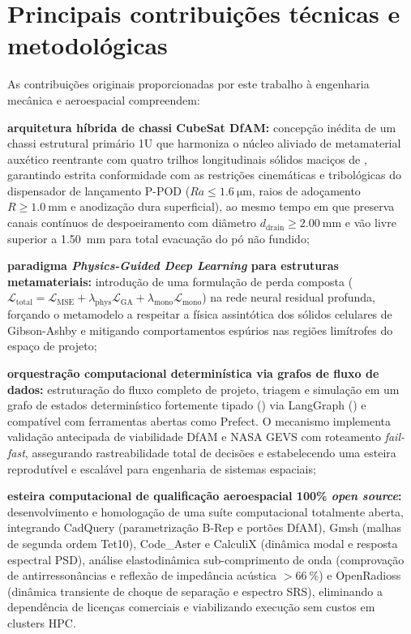 \section{Principais contribuições técnicas e metodológicas}
\label{sec:contribuicoes}

As contribuições originais proporcionadas por este trabalho à engenharia mecânica e aeroespacial compreendem:

\begin{alineas}
  \item \textbf{arquitetura híbrida de chassi CubeSat DfAM:} concepção inédita de um chassi estrutural primário 1U que harmoniza o núcleo aliviado de metamaterial auxético reentrante com quatro trilhos longitudinais sólidos maciços de \rail{}, garantindo estrita conformidade com as restrições cinemáticas e tribológicas do dispensador de lançamento P-POD ($Ra \le \SI{1.6}{\micro\metre}$, raios de adoçamento $R \ge \SI{1.0}{\milli\metre}$ e anodização dura superficial), ao mesmo tempo em que preserva canais contínuos de despoeiramento com diâmetro $d_{\text{drain}} \ge \SI{2.00}{\milli\metre}$ e vão livre superior a \SI{1.50}{\milli\metre} para total evacuação do pó não fundido;
  
  \item \textbf{paradigma \textit{Physics-Guided Deep Learning} para estruturas metamateriais:} introdução de uma formulação de perda composta ($\mathcal{L}_{\text{total}} = \mathcal{L}_{\text{MSE}} + \lambda_{\text{phys}}\mathcal{L}_{\text{GA}} + \lambda_{\text{mono}}\mathcal{L}_{\text{mono}}$) na rede neural residual profunda, forçando o metamodelo a respeitar a física assintótica dos sólidos celulares de Gibson-Ashby e mitigando comportamentos espúrios nas regiões limítrofes do espaço de projeto;
  
  \item \textbf{orquestração computacional determinística via grafos de fluxo de dados:} estruturação do fluxo completo de projeto, triagem e simulação em um grafo de estados determinístico fortemente tipado () via LangGraph () e compatível com ferramentas abertas como Prefect. O mecanismo implementa validação antecipada de viabilidade DfAM e NASA GEVS com roteamento \textit{fail-fast}, assegurando rastreabilidade total de decisões e estabelecendo uma esteira reprodutível e escalável para engenharia de sistemas espaciais;
  
  \item \textbf{esteira computacional de qualificação aeroespacial 100\% \textit{open source}:} desenvolvimento e homologação de uma suíte computacional totalmente aberta, integrando CadQuery (parametrização B-Rep e portões DfAM), Gmsh (malhas de segunda ordem Tet10), Code\_Aster e CalculiX (dinâmica modal e resposta espectral PSD), análise elastodinâmica sub-comprimento de onda (comprovação de antirressonâncias e reflexão de impedância acústica $> \SI{66}{\percent}$) e OpenRadioss (dinâmica transiente de choque de separação e espectro SRS), eliminando a dependência de licenças comerciais e viabilizando execução sem custos em clusters HPC.
\end{alineas}

